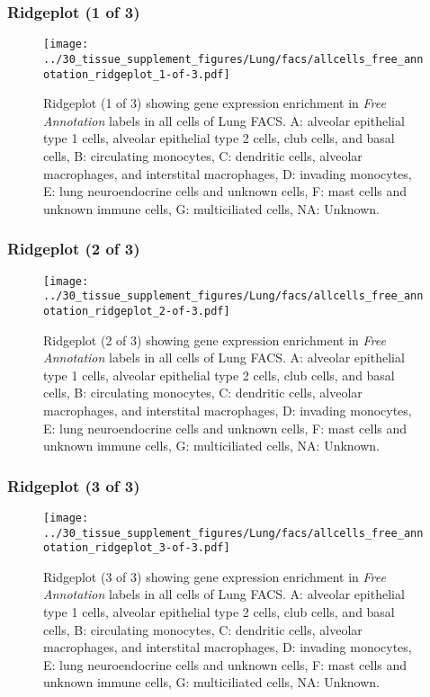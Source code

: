 \subsubsection{Ridgeplot (1 of 3)}
\begin{figure}[h]
\centering
\texttt{[image: ../30\_tissue\_supplement\_figures/Lung/facs/allcells\_free\_annotation\_ridgeplot\_1-of-3.pdf]}

\caption{ Ridgeplot (1 of 3)  showing gene expression enrichment in \emph{Free Annotation} labels in all cells of Lung FACS. A: alveolar epithelial type 1 cells, alveolar epithelial type 2 cells, club cells, and basal cells, B: circulating monocytes, C: dendritic cells, alveolar macrophages, and interstital macrophages, D: invading monocytes, E: lung neuroendocrine cells and unknown cells, F: mast cells and unknown immune cells, G: multiciliated cells, NA: Unknown.}
\end{figure}


\clearpage

\subsubsection{Ridgeplot (2 of 3)}
\begin{figure}[h]
\centering
\texttt{[image: ../30\_tissue\_supplement\_figures/Lung/facs/allcells\_free\_annotation\_ridgeplot\_2-of-3.pdf]}

\caption{ Ridgeplot (2 of 3)  showing gene expression enrichment in \emph{Free Annotation} labels in all cells of Lung FACS. A: alveolar epithelial type 1 cells, alveolar epithelial type 2 cells, club cells, and basal cells, B: circulating monocytes, C: dendritic cells, alveolar macrophages, and interstital macrophages, D: invading monocytes, E: lung neuroendocrine cells and unknown cells, F: mast cells and unknown immune cells, G: multiciliated cells, NA: Unknown.}
\end{figure}


\clearpage

\subsubsection{Ridgeplot (3 of 3)}
\begin{figure}[h]
\centering
\texttt{[image: ../30\_tissue\_supplement\_figures/Lung/facs/allcells\_free\_annotation\_ridgeplot\_3-of-3.pdf]}

\caption{ Ridgeplot (3 of 3)  showing gene expression enrichment in \emph{Free Annotation} labels in all cells of Lung FACS. A: alveolar epithelial type 1 cells, alveolar epithelial type 2 cells, club cells, and basal cells, B: circulating monocytes, C: dendritic cells, alveolar macrophages, and interstital macrophages, D: invading monocytes, E: lung neuroendocrine cells and unknown cells, F: mast cells and unknown immune cells, G: multiciliated cells, NA: Unknown.}
\end{figure}


